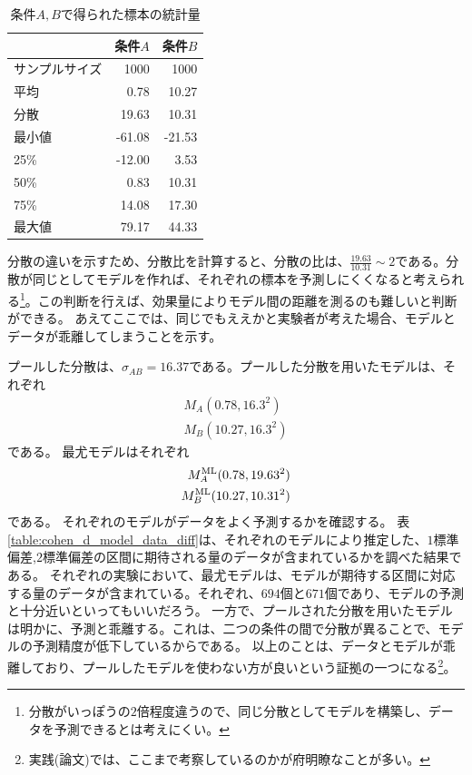 \begin{table}[hbtp]
 \caption{条件$A,B$で得られた標本の統計量}
 \label{table:cohen_d_pooled_std_model}
 \centering
\begin{tabular}{lrr}
\hline
{} &   条件$A$ &   条件$B$ \\
\hline
サンプルサイズ & 1000 & 1000 \\
平均  &    0.78 &   10.27 \\
分散   &   19.63 &   10.31 \\
最小値   &  -61.08 &  -21.53 \\
25\%   &  -12.00 &    3.53 \\
50\%   &    0.83 &   10.31 \\
75\%   &   14.08 &   17.30 \\
最大値   &   79.17 &   44.33 \\
\hline
\end{tabular}
\end{table}


分散の違いを示すため、分散比を計算すると、分散の比は、$\frac{19.63}{10.31}\sim 2$である。分散が同じとしてモデルを作れば、それぞれの標本を予測しにくくなると考えられる\footnote{分散がいっぽうの$2$倍程度違うので、同じ分散としてモデルを構築し、データを予測できるとは考えにくい。}。この判断を行えば、効果量によりモデル間の距離を測るのも難しいと判断ができる。
あえてここでは、同じでもええかと実験者が考えた場合、モデルとデータが乖離してしまうことを示す。

プールした分散は、$\sigma_{AB}=16.37$である。プールした分散を用いたモデルは、それぞれ
\begin{eqnarray*}
 M_A(0.78,16.3^2)\\
 M_B(10.27,16.3^2)
\end{eqnarray*}
である。
最尤モデルはそれぞれ
\begin{eqnarray}
 M_A^{\rm{ML}}(0.78, 19.63^2)\\
 M_B^{\rm{ML}}(10.27, 10.31^2)
\end{eqnarray}
である。
それぞれのモデルがデータをよく予測するかを確認する。
表\ref{table:cohen_d_model_data_diff}は、それぞれのモデルにより推定した、$1$標準偏差,$2$標準偏差の区間に期待される量のデータが含まれているかを調べた結果である。
それぞれの実験において、最尤モデルは、モデルが期待する区間に対応する量のデータが含まれている。それぞれ、$694$個と$671$個であり、モデルの予測と十分近いといってもいいだろう。
一方で、プールされた分散を用いたモデルは明かに、予測と乖離する。これは、二つの条件の間で分散が異ることで、モデルの予測精度が低下しているからである。
以上のことは、データとモデルが乖離しており、プールしたモデルを使わない方が良いという証拠の一つになる\footnote{実践(論文)では、ここまで考察しているのかが府明瞭なことが多い。}。


